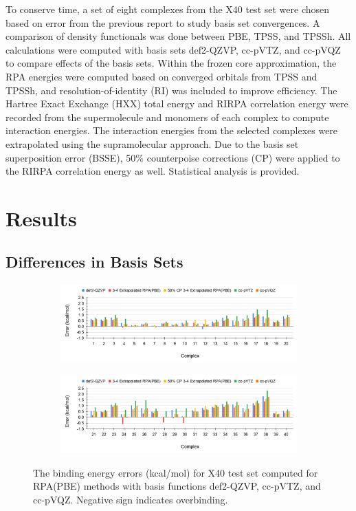 \documentclass[11pt]{article}
\begin{document}
To conserve time, a set of eight complexes from the X40 test set were
chosen based on error from the previous report to study basis set
convergences. A comparison of density functionals was done between
PBE, TPSS, and TPSSh. All calculations were computed with basis sets def2-QZVP,
cc-pVTZ, and cc-pVQZ to compare effects of the basis sets. Within the frozen core approximation,
the RPA energies were computed based on converged orbitals from TPSS and TPSSh, and
resolution-of-identity (RI) was included to improve efficiency. The Hartree
Exact Exchange (HXX) total energy and RIRPA correlation energy were
recorded from the supermolecule and monomers of each complex to compute
interaction energies. The interaction energies from the selected complexes
were extrapolated using the supramolecular approach. Due to the basis set
superposition error (BSSE), 50$\%$ counterpoise corrections (CP) were
applied to the RIRPA correlation energy as well. Statistical analysis
is provided.

\section{Results}

\subsection{Differences in Basis Sets}

\begin{figure}[hbpt]
  \centering
  \begin{subfigure}{\textwidth}
    \center
    \includegraphics[scale=0.35]{def2-QZVP_1.png}
    \label{fig:def2-QZVP_1}
  \end{subfigure}
  \begin{subfigure}{\textwidth}
    \center
    \includegraphics[scale=0.35]{def2-QZVP_2.png}
    \label{fig:def2-QZVP_2}
  \end{subfigure}
  \caption{The binding energy errors (kcal/mol) for X40 test set computed
    for RPA(PBE) methods with basis functions def2-QZVP, cc-pVTZ, and
    cc-pVQZ. Negative sign indicates overbinding.}
  \label{fig:def2-QZVP Error}
\end{figure}
\end{document}

